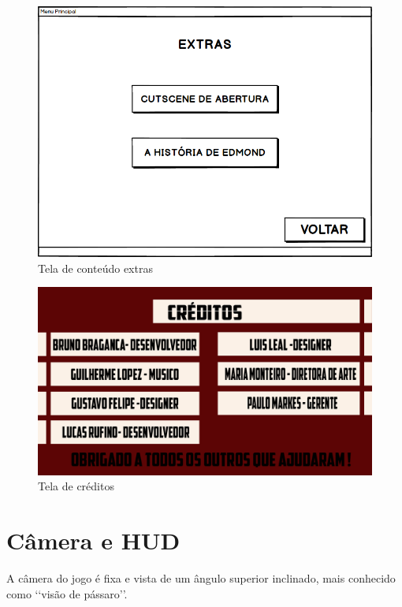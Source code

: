 \begin{figure}[!h]
    \label{Textra}
    \centering
    \caption{Tela de conteúdo extras}
    \includegraphics[keepaspectratio=true,scale=0.35]{images/EXTRAS.png}
\end{figure}

\begin{figure}[!h]
    \label{Tcred}
    \centering
    \caption{Tela de créditos}
   \includegraphics[keepaspectratio=true,scale=0.35]{images/telaCreditos.png}
\end{figure}

\vspace*{10cm}
\section{Câmera e HUD}
A câmera do jogo é fixa e vista de um ângulo superior inclinado, mais conhecido como \lq\lq visão de pássaro\rq\rq. 

